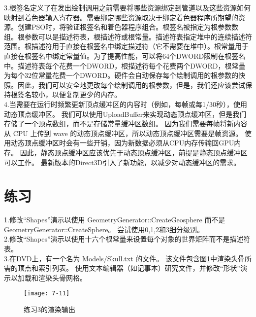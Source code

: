 \begin{flushleft}
3.根签名定义了在发出绘制调用之前需要将哪些资源绑定到管道以及这些资源如何映射到着色器输入寄存器。需要绑定哪些资源取决于绑定着色器程序所期望的资源。创建PSO时，将验证根签名和着色器程序组合。根签名被指定为根参数数组。根参数可以是描述符表，根描述符或根常量。描述符表指定堆中的连续描述符范围。根描述符用于直接在根签名中绑定描述符（它不需要在堆中）。根常量用于直接在根签名中绑定常量值。为了提高性能，可以将64个DWORD限制在根签名中。描述符表每个花费一个DWORD，根描述符每个花费两个DWORD，根常量为每个32位常量花费一个DWORD。硬件会自动保存每个绘制调用的根参数的快照。因此，我们可以安全地更改每个绘制调用的根参数，但是，我们还应该尝试保持根签名较小，以便复制更少的内存。\\
4.当需要在运行时频繁更新顶点缓冲区的内容时（例如，每帧或每1/30秒），使用动态顶点缓冲区。 我们可以使用UploadBuffer来实现动态顶点缓冲区，但是我们存储了一个顶点数组，而不是存储常量缓冲区数组。 因为我们需要每帧将新内容从 CPU 上传到 wave 的动态顶点缓冲区，所以动态顶点缓冲区需要是帧资源。 使用动态顶点缓冲区时会有一些开销，因为新数据必须从CPU内存传输回GPU内存。 因此，静态顶点缓冲区应该优先于动态顶点缓冲区，前提是静态顶点缓冲区可以工作。 最新版本的Direct3D引入了新功能，以减少对动态缓冲区的需求。\\
\end{flushleft}

\section{练习}
\begin{flushleft}
1.修改“Shapes”演示以使用 GeometryGenerator::CreateGeosphere 而不是 GeometryGenerator::CreateSphere。 尝试使用0,1,2和3细分级别。\\
2.修改“Shapes”演示以使用十六个根常量来设置每个对象的世界矩阵而不是描述符表。\\
3.在DVD上，有一个名为 Models/Skull.txt 的文件。 该文件包含图\ref{fig:7-11}中渲染头骨所需的顶点和索引列表。 使用文本编辑器（如记事本）研究文件，并修改“形状”演示以加载和渲染头骨网格。
\end{flushleft}

\begin{figure}[h]
    \texttt{[image: 7-11]}
    \centering
    \caption{练习3的渲染输出}
    \label{fig:7-11}
\end{figure}













